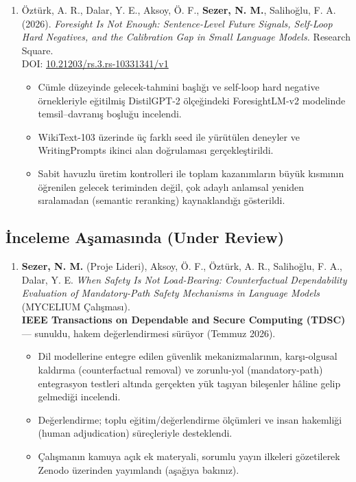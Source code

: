 \documentclass[11pt,a4paper]{article}
\begin{document}
\begin{enumerate}[leftmargin=*, itemsep=0.35em, topsep=2pt, start=4]
    \item Öztürk, A. R., Dalar, Y. E., Aksoy, Ö. F., \textbf{Sezer, N. M.}, Salihoğlu, F. A. (2026). \textit{Foresight Is Not Enough: Sentence-Level Future Signals, Self-Loop Hard Negatives, and the Calibration Gap in Small Language Models.} Research Square. \\
    DOI: \href{https://doi.org/10.21203/rs.3.rs-10331341/v1}{10.21203/rs.3.rs-10331341/v1}
    \begin{itemize}
        \item Cümle düzeyinde gelecek-tahmini başlığı ve self-loop hard negative örnekleriyle eğitilmiş DistilGPT-2 ölçeğindeki ForesightLM-v2 modelinde temsil--davranış boşluğu incelendi.
        \item WikiText-103 üzerinde üç farklı seed ile yürütülen deneyler ve WritingPrompts ikinci alan doğrulaması gerçekleştirildi.
        \item Sabit havuzlu üretim kontrolleri ile toplam kazanımların büyük kısmının öğrenilen gelecek teriminden değil, çok adaylı anlamsal yeniden sıralamadan (semantic reranking) kaynaklandığı gösterildi.
    \end{itemize}

\end{enumerate}

\subsection*{İnceleme Aşamasında (Under Review)}
\begin{enumerate}[leftmargin=*, itemsep=0.35em, topsep=2pt, start=8]
    \item \textbf{Sezer, N. M.} (Proje Lideri), Aksoy, Ö. F., Öztürk, A. R., Salihoğlu, F. A., Dalar, Y. E. \textit{When Safety Is Not Load-Bearing: Counterfactual Dependability Evaluation of Mandatory-Path Safety Mechanisms in Language Models} (MYCELIUM Çalışması). \\
    \textbf{IEEE Transactions on Dependable and Secure Computing (TDSC)} --- sunuldu, hakem değerlendirmesi sürüyor (Temmuz 2026).
    \begin{itemize}
        \item Dil modellerine entegre edilen güvenlik mekanizmalarının, karşı-olgusal kaldırma (counterfactual removal) ve zorunlu-yol (mandatory-path) entegrasyon testleri altında gerçekten yük taşıyan bileşenler hâline gelip gelmediği incelendi.
        \item Değerlendirme; toplu eğitim/değerlendirme ölçümleri ve insan hakemliği (human adjudication) süreçleriyle desteklendi.
        \item Çalışmanın kamuya açık ek materyali, sorumlu yayın ilkeleri gözetilerek Zenodo üzerinden yayımlandı (aşağıya bakınız).
    \end{itemize}
\end{enumerate}
\end{document}
